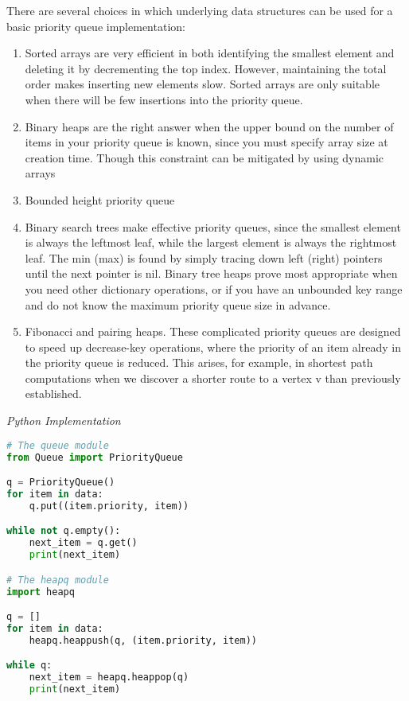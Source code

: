 \documentclass{article}
\begin{document}
    There are several choices in which underlying data structures can be used for a basic priority queue implementation:
    \begin{enumerate}
        \item Sorted arrays are very efficient in both identifying the smallest element and deleting it by decrementing the top index. However, maintaining the total order makes inserting new elements slow. Sorted arrays are only suitable when there will be few insertions into the priority queue.
        
        \item Binary heaps are the right answer when the upper bound on the number of items in your priority queue is known, since you must specify array size at creation time. Though this constraint can be mitigated by using dynamic arrays
        
        \item Bounded height priority queue
        
        \item Binary search trees make effective priority queues, since the smallest element is always the leftmost leaf, while the largest element is always the rightmost leaf. The min (max) is found by simply tracing down left (right) pointers until the next pointer is nil. Binary tree heaps prove most appropriate when you need other dictionary operations, or if you have an unbounded key range and do not know the maximum priority queue size in advance.
        
        \item Fibonacci and pairing heaps. These complicated priority queues are designed to speed up decrease-key operations, where the priority of an item already in the priority queue is reduced. This arises, for example, in shortest path computations when we discover a shorter route to a vertex v than previously established.
    \end{enumerate}
    
\vspace{8pt} \emph{Python Implementation}
\begin{lstlisting}[language=Python]
# The queue module
from Queue import PriorityQueue

q = PriorityQueue()
for item in data:
    q.put((item.priority, item))

while not q.empty():
    next_item = q.get()
    print(next_item)

# The heapq module
import heapq

q = []
for item in data:
    heapq.heappush(q, (item.priority, item))

while q:
    next_item = heapq.heappop(q)
    print(next_item)
\end{lstlisting}
    
\end{document}
